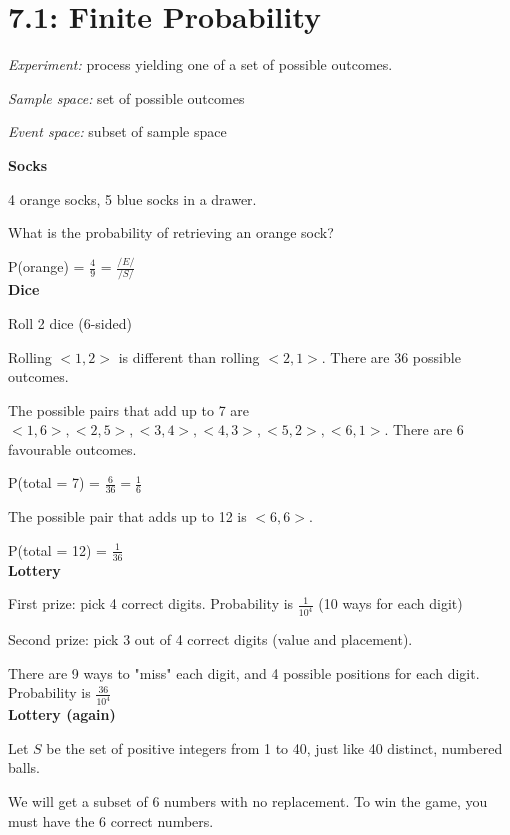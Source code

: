 \documentclass[english]{exam}
\begin{document}
	
    \section{7.1: Finite Probability}
    
    \textit{Experiment:} process yielding one of a set of possible outcomes.
    
    \textit{Sample space:} set of possible outcomes
    
    \textit{Event space:} subset of sample space
    
    \textbf{Socks}
    
    4 orange socks, 5 blue socks in a drawer.
    
    What is the probability of retrieving an orange sock?
    
    P(orange) = $\frac{4}{9}$ = $\frac{/E/}{/S/}$\\
    
    \textbf{Dice}
    
    Roll 2 dice (6-sided)
    
    Rolling $<1,2>$ is different than rolling $<2,1>$. There are 36 possible outcomes.
    
    The possible pairs that add up to 7 are $<1,6>, <2,5>, <3,4>, <4,3>, <5,2>, <6,1>$. There are 6 favourable outcomes.
    
    P(total = 7) = $\frac{6}{36} = \frac{1}{6}$
    
    The possible pair that adds up to 12 is $<6,6>$.
    
    P(total = 12) = $\frac{1}{36}$\\
    
    \textbf{Lottery}
    
    First prize: pick 4 correct digits. Probability is $\frac{1}{10^4}$ (10 ways for each digit)
    
    Second prize: pick 3 out of 4 correct digits (value and placement).
    
    There are 9 ways to "miss" each digit, and 4 possible positions for each digit. Probability is $\frac{36}{10^4}$\\
    
    \textbf{Lottery (again)}
    
    Let $S$ be the set of positive integers from 1 to 40, just like 40 distinct, numbered balls.
    
    We will get a subset of 6 numbers with no replacement. To win the game, you must have the 6 correct numbers.
    
\end{document}
